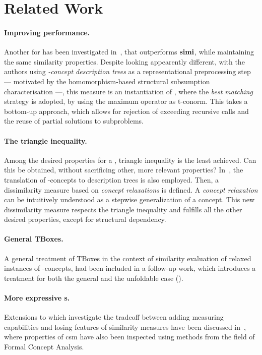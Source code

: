 \section{Related Work}

\paragraph{Improving performance.}
Another \csm for \elh has been investigated in~\cite{simEL}, that outperforms \(\mathbf{simi}\), while maintaining the same similarity properties.
Despite looking appearently different, with the authors using \emph{\elh-concept description trees} as a representational preprocessing step --- motivated by the homomorphism-based structural subsumption characterisation ---, this measure is an instantiation of \simi, where the \emph{best matching} strategy is adopted, by using the maximum operator as t-conorm.
This \csm takes a bottom-up approach, which allows for rejection of exceeding recursive calls and the reuse of partial solutions to subproblems.

\paragraph{The triangle inequality.}
Among the desired properties for a \csm, triangle inequality is the least achieved.
Can this be obtained, without sacrificing other, more relevant properties?
In~\cite{TriEq}, the translation of \el-concepts to description trees is also employed. Then, a dissimilarity measure based on \emph{concept relaxations} is defined. A \emph{concept relaxation} can be intuitively understood as a stepwise generalization of a concept.
This new dissimilarity measure respects the triangle inequality and fulfills all the other desired properties, except for structural dependency.

  \paragraph{General TBoxes.} A general treatment of TBoxes in the context of similarity evaluation of relaxed instances of \el-concepts, had been included in a follow-up work, which introduces a treatment for both the general and the unfoldable case (\cite{Ec14}).

  \paragraph{More expressive \dl{}s.}
  Extensions to \simi which investigate the tradeoff between adding measuring capabilities and losing  features of similarity measures have been discussed in~\cite{Lae-dip}, where properties of \gls{csm} have also been inspected using methods from the field of Formal Concept Analysis.


